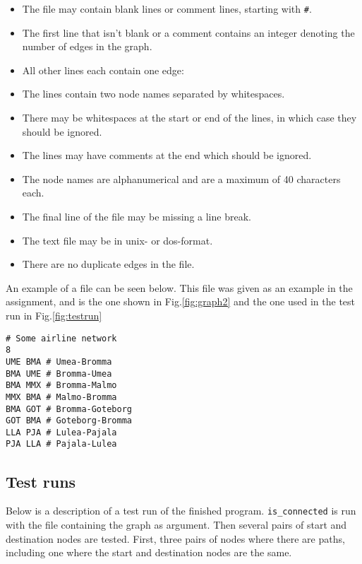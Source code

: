 \documentclass{article}
\begin{document}
\begin{itemize}
\item The file may contain blank lines or comment lines, starting with \texttt{\#}.

\item The first line that isn't blank or a comment contains an integer denoting the number of edges in the graph. 

\item All other lines each contain one edge:

\item The lines contain two node names separated by whitespaces.

\item There may be whitespaces at the start or end of the lines, in which case they should be ignored.

\item The lines may have comments at the end which should be ignored. 

\item The node names are alphanumerical and are a maximum of 40 characters each. 

\item The final line of the file may be missing a line break. 

\item The text file may be in unix- or dos-format. 

\item There are no duplicate edges in the file. 
\end{itemize}
An example of a file can be seen below. This file was given as an example in the assignment, and is the one shown in Fig.\eqref{fig:graph2} and the one used in the test run in Fig.\eqref{fig:testrun}

\begin{verbatim}
# Some airline network
8
UME BMA # Umea-Bromma
BMA UME # Bromma-Umea
BMA MMX # Bromma-Malmo
MMX BMA # Malmo-Bromma
BMA GOT # Bromma-Goteborg
GOT BMA # Goteborg-Bromma
LLA PJA # Lulea-Pajala
PJA LLA # Pajala-Lulea
\end{verbatim}
\subsection{Test runs}
\label{sec:test_run}
Below is a description of a test run of the finished program. \texttt{is\_connected} is run with the file containing the graph as argument. Then several pairs of start and destination nodes are tested. First, three pairs of nodes where there are paths, including one where the start and destination nodes are the same. 
\end{document}
